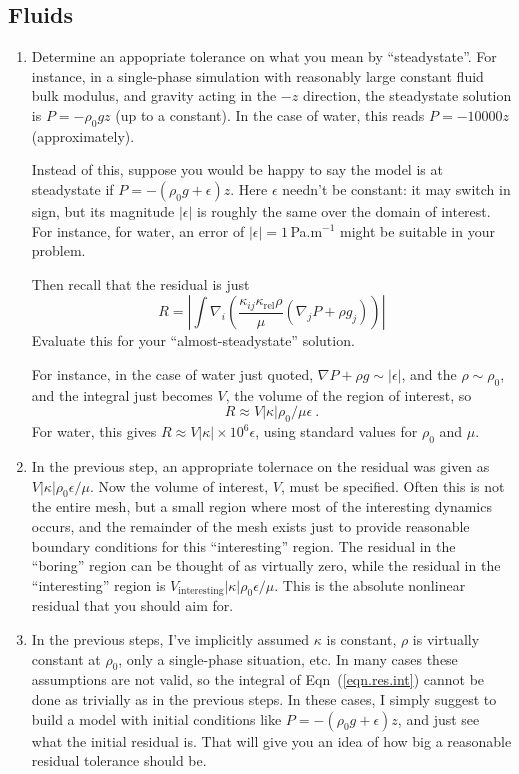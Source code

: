 \documentclass[12pt]{report}
\begin{document}
\subsection{Fluids}

\begin{enumerate}
\item Determine an appopriate tolerance on what you mean by
  ``steadystate''.  For instance, in a single-phase simulation with
  reasonably large constant fluid bulk modulus, and gravity acting in
  the $-z$ direction, the steadystate solution is $P = -\rho_{0}gz$
  (up to a constant).  In the case of water, this reads $P=-10000z$
  (approximately).

  Instead of this, suppose you would be happy to say the model is at
  steadystate if $P = -(\rho_{0} g + \epsilon)z$.  Here $\epsilon$
  needn't be constant: it may switch in sign, but its magnitude
  $|\epsilon|$ is roughly the same over the domain of interest.  For instance, for
  water, an error of 
  $|\epsilon|=1$\,Pa.m$^{-1}$ might be suitable in your problem.

Then recall
  that the residual is just
\begin{equation}
R = \left|\int
\nabla_{i}\left(\frac{\kappa_{ij}\kappa_{\mathrm{rel}}\rho}{\mu}(\nabla_{j}P
+ \rho g_{j}) \right) \right|
\label{eqn.res.int}
\end{equation}
Evaluate this for your ``almost-steadystate'' solution.

For instance, in the
case of water just quoted, $\nabla P + \rho g \sim |\epsilon|$, and
the $\rho\sim\rho_{0}$, and the integral just becomes $V$, the volume
of the region of interest, so
\begin{equation}
R \approx V|\kappa|\rho_{0}/\mu\epsilon \ .
\end{equation}
For water, this gives $R \approx V|\kappa|\times 10^{6}\epsilon$,
using standard values for $\rho_{0}$ and $\mu$.
\item In the previous step, an appropriate tolernace on the residual
  was given as $V|\kappa|\rho_{0}\epsilon/\mu$.  Now the volume of
  interest, $V$, must be specified.  Often this is not the entire
  mesh, but a small region where most of the interesting dynamics occurs, and the
  remainder of the mesh exists just to provide reasonable boundary
  conditions for this ``interesting'' region.  The residual in the
  ``boring'' region can be thought of as virtually zero, while the
  residual in the ``interesting'' region is
  $V_{\mathrm{interesting}}|\kappa|\rho_{0}\epsilon/\mu$.  This is the
  absolute nonlinear residual that you should aim for.
\item In the previous steps, I've implicitly assumed $\kappa$ is
  constant, $\rho$ is virtually constant at $\rho_{0}$, only a
  single-phase situation, etc.  In many cases these assumptions are
  not valid, so the integral of Eqn~(\ref{eqn.res.int}) cannot be done
  as trivially as in the previous steps.  In these cases, I simply
  suggest to build a model with initial conditions like $P =
  -(\rho_{0} g + \epsilon)z$, and just see what the initial residual is.
  That will give you an idea of how big a reasonable residual
  tolerance should be.
\end{enumerate}
\end{document}
